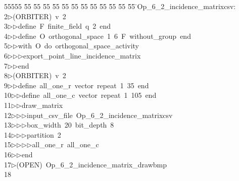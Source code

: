 %
%
\begin{tabbing}
55555 \= 55 \= 55 \= 55 \= 55 \= 55 \= 55 \= 55 \= 55 \= 55 \= 55 \= 55 \= 55 \= \>Op\_6\_2\_incidence\_matrixcsv:\\[0pt]
2\>$\triangleright$\>(ORBITER)\ v\ 2\ \\[0pt]
3\>$\triangleright$\>$\triangleright$\>define\ F\ finite\_field\ q\ 2\ end\ \\[0pt]
4\>$\triangleright$\>$\triangleright$\>define\ O\ orthogonal\_space\ 1\ 6\ F\ without\_group\ end\ \\[0pt]
5\>$\triangleright$\>$\triangleright$\>with\ O\ do\ orthogonal\_space\_activity\ \\[0pt]
6\>$\triangleright$\>$\triangleright$\>$\triangleright$\>export\_point\_line\_incidence\_matrix\ \\[0pt]
7\>$\triangleright$\>$\triangleright$\>end\\[0pt]
8\>$\triangleright$\>(ORBITER)\ v\ 2\ \\[0pt]
9\>$\triangleright$\>$\triangleright$\>define\ all\_one\_r\ vector\ repeat\ 1\ 35\ end\ \\[0pt]
10\>$\triangleright$\>$\triangleright$\>define\ all\_one\_c\ vector\ repeat\ 1\ 105\ end\ \\[0pt]
11\>$\triangleright$\>$\triangleright$\>draw\_matrix\ \\[0pt]
12\>$\triangleright$\>$\triangleright$\>$\triangleright$\>input\_csv\_file\ Op\_6\_2\_incidence\_matrixcsv\ \\[0pt]
13\>$\triangleright$\>$\triangleright$\>$\triangleright$\>box\_width\ 20\ bit\_depth\ 8\ \\[0pt]
14\>$\triangleright$\>$\triangleright$\>$\triangleright$\>partition\ 2\ \\[0pt]
15\>$\triangleright$\>$\triangleright$\>$\triangleright$\>$\triangleright$\>all\_one\_r\ all\_one\_c\ \\[0pt]
16\>$\triangleright$\>$\triangleright$\>end\\[0pt]
17\>$\triangleright$\>(OPEN)\ Op\_6\_2\_incidence\_matrix\_drawbmp\\[0pt]
18\>\end{tabbing}
